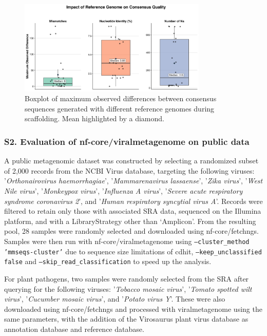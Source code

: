 \begin{figure}[!h]
    \centering
    \includegraphics[width=0.8\textwidth]{Fig/fig2.png}
    \caption{Boxplot of maximum observed differences between consensus sequences generated with different reference genomes during scaffolding. Mean highlighted by a diamond.}
    \label{fig:reference-influence-supp}
\end{figure}


\subsubsection*{S2. Evaluation of nf-core/viralmetagenome on public data}

A public metagenomic dataset was constructed by selecting a randomized subset of 2,000 records from the NCBI Virus database, targeting the following viruses: '\textit{Orthonairovirus haemorrhagiae}', '\textit{Mammarenavirus lassaense}', '\textit{Zika virus}', '\textit{West Nile virus}', '\textit{Monkeypox virus}', '\textit{Influenza A virus}', '\textit{Severe acute respiratory syndrome coronavirus 2}', and '\textit{Human respiratory syncytial virus A}'. Records were filtered to retain only those with associated SRA data, sequenced on the Illumina platform, and with a LibraryStrategy other than ‘Amplicon’. From the resulting pool, 28 samples were randomly selected and downloaded using nf-core/fetchngs. Samples were then run with nf-core/viralmetagenome using \texttt{--cluster\_method 'mmseqs-cluster'} due to sequence size limitations of cdhit, \texttt{--keep\_unclassified false} and \texttt{--skip\_read\_classification} to speed up the analysis.

For plant pathogens, two samples were randomly selected from the SRA after querying for the following viruses: '\textit{Tobacco mosaic virus}', '\textit{Tomato spotted wilt virus}', '\textit{Cucumber mosaic virus}', and '\textit{Potato virus Y}'. These were also downloaded using nf-core/fetchngs and processed with viralmetagenome using the same parameters, with the addition of the Virosaurus plant virus database as annotation database and reference database.

